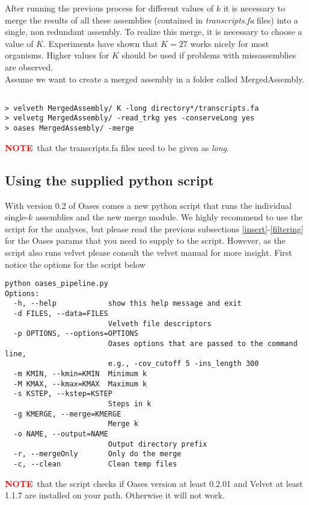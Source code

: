 \documentclass[12pt]{article}
\newcommand{\NOTE}{\textcolor{red}{\textbf{NOTE}}}
\begin{document}
After running the previous process for different values of $k$ it is necessary to merge the results of all these assemblies (contained in \emph{transcripts.fa} files) into a single, non redundant assembly. To realize this merge, it is necessary to choose a value of $K$. Experiments have shown that $K=27$ works nicely for most organisms. Higher values for $K$ should be used if problems with missassemblies are observed. \\
 Assume we want to create a merged assembly in a folder called MergedAssembly.
\begin{verbatim}

> velveth MergedAssembly/ K -long directory*/transcripts.fa
> velvetg MergedAssembly/ -read_trkg yes -conserveLong yes
> oases MergedAssembly/ -merge
\end{verbatim}
\NOTE \ that the transcripts.fa files need to be given as \emph{long}. \\

\subsection{Using the supplied python script}
With version 0.2 of Oases comes a new python script that runs the individual single-$k$ assemblies and the new merge module. We highly recommend to use the script for the analyses, but please read the previous subsections \ref{insert}-\ref{filtering} for the Oases params that you need to supply to the script.  However, as the script also runs velvet please consult the velvet manual for more insight.
First notice the options for the script below \

\begin{verbatim}
python oases_pipeline.py
Options:
  -h, --help            show this help message and exit
  -d FILES, --data=FILES
                        Velveth file descriptors
  -p OPTIONS, --options=OPTIONS
                        Oases options that are passed to the command line,
                        e.g., -cov_cutoff 5 -ins_length 300
  -m KMIN, --kmin=KMIN  Minimum k
  -M KMAX, --kmax=KMAX  Maximum k
  -s KSTEP, --kstep=KSTEP
                        Steps in k
  -g KMERGE, --merge=KMERGE
                        Merge k
  -o NAME, --output=NAME
                        Output directory prefix
  -r, --mergeOnly       Only do the merge
  -c, --clean           Clean temp files
\end{verbatim}

\NOTE \ that the script checks if Oases version at least 0.2.01 and Velvet at least 1.1.7 are installed on your path. Otherwise it will not work.
 
\end{document}
